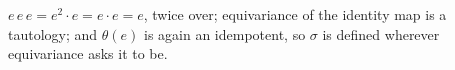 $e\,e\,e = e^2 \cdot e = e \cdot e = e$, twice over; equivariance of the identity map is a tautology; and $\theta(e)$ is again an idempotent, so $\sigma$ is defined wherever equivariance asks it to be.
